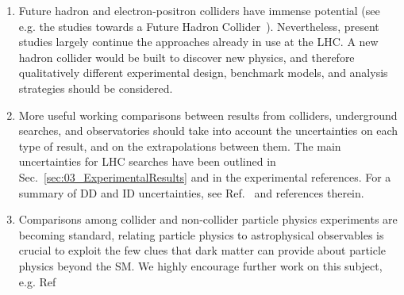 \begin{issues}
\begin{enumerate}
\item Future hadron and electron-positron colliders have immense potential (see e.g. the studies towards a Future Hadron Collider~\cite{Golling:2016gvc}). Nevertheless, present studies largely continue the approaches already in use at the LHC. A new hadron collider would be built to discover new physics, and therefore qualitatively different experimental design, benchmark models, and analysis strategies should be considered.

\item More useful working comparisons between results from colliders, underground searches, and observatories should take into account the uncertainties on each type of result, and on the extrapolations between them.
  The main uncertainties for LHC searches have been outlined in Sec.~\ref{sec:03_ExperimentalResults} and in the experimental references.
  For a summary of DD and ID uncertainties, see Ref.~\cite{Feldstein:2014ufa,d300ef23986a49099715e661295a4d72} and references therein.

\item Comparisons among collider and non-collider particle physics experiments are becoming standard, relating particle physics to astrophysical observables is crucial to exploit the few clues that dark matter can provide about particle physics beyond the SM. We highly encourage further work on this subject, e.g. Ref~\cite{Buckley:2017ijx}

\end{enumerate}
\end{issues}
